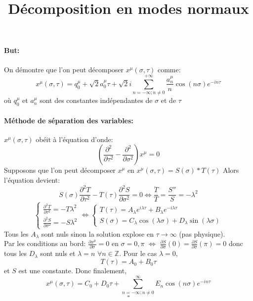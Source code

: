 \documentclass[a4paper,12pt]{article}
\title{Décomposition en modes normaux }
\def\xmu{x^\mu}
\begin{document}
\maketitle
\paragraph{But:}
On démontre que l'on peut décomposer $\xmu(\sigma,\tau)$ comme:
\begin{equation}
\xmu(\sigma,\tau)= q_0^\mu + \sqrt{2}a_0^\mu \tau + \sqrt{2}i\sum_{n=-\infty;n\neq 0}^{+\infty}\frac{a_n^\mu}{n}\cos(n\sigma)e^{-in\tau}
\end{equation}
où $q_0^\mu$ et $a_n^\mu$ sont des constantes indépendantes de $\sigma$ et de $\tau$
\paragraph{Méthode de séparation des variables:}
$\xmu(\sigma,\tau)$ obéit à l'équation d'onde: $$\left( \frac{\partial^2}{\partial  \tau^2}-\frac{\partial^2}{\partial  \sigma^2}\right) \xmu=0$$
Supposons que l'on peut décomposer $\xmu$ en $\xmu(\sigma,\tau)=S(\sigma)*T(\tau)$
Alors l'équation devient: 
\begin{equation}
S(\sigma)\frac{\partial^2 T}{\partial \tau^2}-T(\tau)\frac{\partial^2 S}{\partial \sigma^2}=0 \Leftrightarrow \frac{\ddot{T}}{T}=\frac{S''}{S}= -\lambda^2
\end{equation}
\begin{equation}
	\left\lbrace 
	\begin{aligned}
		\frac{\partial^2 T}{\partial \tau^2}=-T\lambda^2\\
		\frac{\partial^2 S}{\partial \sigma^2}=-S\lambda^2
	\end{aligned}
	\right.
	\Leftrightarrow
	\left\lbrace
	\begin{aligned}
	T(\tau)=A_\lambda e^{i\lambda\tau}+B_\lambda e^{-i\lambda\tau}\\
	S(\sigma)=C_\lambda \cos(\lambda \sigma) + D_\lambda \sin(\lambda\sigma)
	\end{aligned}
	\right.
\end{equation}
Tous les $A_\lambda$ sont nuls sinon la solution explose en $\tau\rightarrow\infty$ (pas physique).\\
Par les conditions au bord: $\frac{\partial \xmu}{\partial \sigma}=0$ en $\sigma=0,\pi$ $\Leftrightarrow$ $\frac{\partial S}{\partial\sigma}(0)=\frac{\partial S}{\partial \sigma}(\pi)=0$
donc tous les $D_\lambda$ sont nuls et $\lambda=n$ $\forall n \in \mathbb{Z}$.
Pour le cas $\lambda=0$, $$T(\tau)=A_0 + B_0\tau$$ et $S$ est une constante. Donc finalement,
\begin{equation}
\xmu(\sigma,\tau)=C_0 + D_0\tau + \sum_{n=-\infty;n\neq 0}^{\infty}E_n\cos(n\sigma)e^{-in\tau}
\end{equation}
$$\square$$
\end{document}
